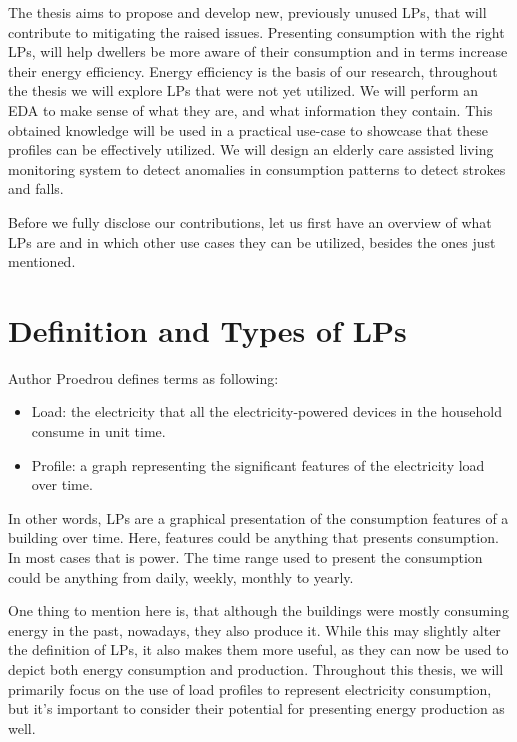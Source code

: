 The thesis aims to propose and develop new, previously unused LPs, that will contribute to mitigating the raised issues.
Presenting consumption with the right LPs, will help dwellers be more aware of their consumption and in terms increase their energy efficiency.
Energy efficiency is the basis of our research, throughout the thesis we will explore LPs that were not yet utilized.
We will perform an EDA to make sense of what they are, and what information they contain.
This obtained knowledge will be used in a practical use-case to showcase that these profiles can be effectively utilized.
We will design an elderly care assisted living monitoring system to detect anomalies in consumption patterns to detect strokes and falls.

Before we fully disclose our contributions, let us first have an overview of what LPs are and in which other use cases they can be utilized, besides the ones just mentioned.


\section{Definition and Types of LPs}
\label{sec:LP_types}
Author Proedrou \cite{Review2021} defines terms as following:


\begin{itemize}
	\item Load: the electricity that all the electricity-powered devices in the household consume in unit time.
	\item Profile: a graph representing the significant features of the electricity load over time.
\end{itemize}

In other words, LPs are a graphical presentation of the consumption features of a building over time. 
Here, features could be anything that presents consumption. 
In most cases that is power.
The time range used to present the consumption could be anything from daily, weekly, monthly to yearly.

One thing to mention here is, that although the buildings were mostly consuming energy in the past, nowadays, they also produce it.
While this may slightly alter the definition of LPs, it also makes them more useful, as they can now be used to depict both energy consumption and production.
Throughout this thesis, we will primarily focus on the use of load profiles to represent electricity consumption, but it's important to consider their potential for presenting energy production as well.
